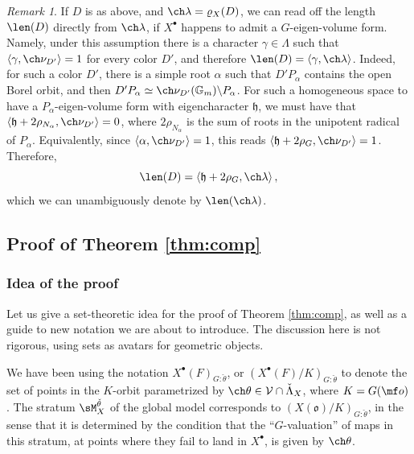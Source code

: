 \documentclass[final]{amsart}
\theoremstyle{remark}
\newtheorem{rem}[subsubsection]{Remark}
\theoremstyle{definition}
\numberwithin{equation}{section}
\begin{document}
\begin{rem}\label{rem:length}
If $D$ is as above, and $\ch\lambda = \varrho_X(D)$, we can read off the length $\len (D)$ directly from $\ch\lambda$, if $X^\bullet$ happens to admit a $G$-eigen-volume form. Namely, under this assumption there is a character $\gamma\in \Lambda$ such that $\left< \gamma, \ch \nu_{D'}\right> = 1$ for every color $D'$, and therefore $\len (D) = \left< \gamma, \ch\lambda\right>$. Indeed, for such a color $D'$, there is a simple root $\alpha$ such that $D'P_\alpha$ contains the open Borel orbit, and then $D'P_\alpha \simeq \ch\nu_{D'}(\mathbb G_m)\backslash P_\alpha$. For such a homogeneous space to have a $P_\alpha$-eigen-volume form with eigencharacter $\mathfrak h$,  we must have that $\left< \mathfrak h+ 2\rho_{N_\alpha}, \ch\nu_{D'}\right> = 0$, where  $2\rho_{N_\alpha}$ is the sum of roots in the unipotent radical of $P_\alpha$. Equivalently, since $\left<\alpha,\ch\nu_{D'}\right>=1$, this reads $\left<\mathfrak h + 2\rho_G, \ch\nu_{D'}\right> = 1$. Therefore, 
\begin{equation}\label{e:length}
 \len (D) = \left< \mathfrak h + 2\rho_G, \ch\lambda\right>,
\end{equation}
which we can unambiguously denote by $\len (\ch\lambda)$.
\end{rem}



\subsection{Proof of Theorem \ref{thm:comp}} 
\label{proof:comp}

\subsubsection{Idea of the proof}


Let us give a set-theoretic idea for the proof of Theorem \ref{thm:comp}, as well as a guide to new notation we are about to introduce. The discussion here is not rigorous, using sets as avatars for geometric objects.

We have been using the notation $X^\bullet(F)_{G:\check\theta}$, or $(X^\bullet(F)/K)_{G:\check\theta}$ to denote the set of points in the $K$-orbit parametrized by $\ch\theta \in \mathcal V \cap \check\Lambda_X$, where $K = G(\mf o)$. The stratum  $\sM_X^{\check\theta}$ of the global model corresponds to $(X(\mathfrak o)/K)_{G:\check\theta}$, in the sense that it is determined by the condition that the ``$G$-valuation'' of maps in this stratum, at points where they fail to land in $X^\bullet$, is given by $\ch\theta$. 
\end{document}
